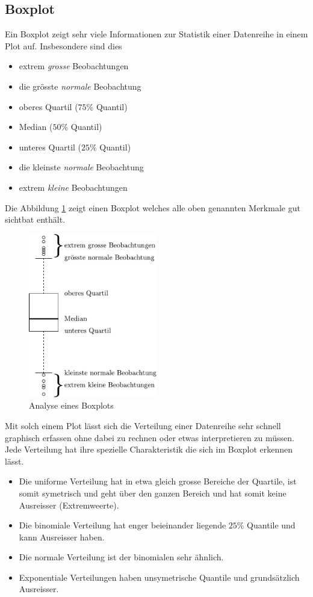 \clearpage

\subsection{Boxplot}
Ein Boxplot zeigt sehr viele Informationen zur Statistik einer 
Datenreihe in einem Plot auf. Insbesondere sind dies
\begin{itemize}
	\item extrem \emph{grosse} Beobachtungen
	\item die grösste \emph{normale} Beobachtung
	\item oberes Quartil ($75$\% Quantil)
	\item Median ($50$\% Quantil)
	\item unteres Quartil ($25$\% Quantil)
	\item die kleinste \emph{normale} Beobachtung
	\item extrem \emph{kleine} Beobachtungen
\end{itemize}
Die Abbildung \ref{fig:boxplot} zeigt einen Boxplot welches alle
oben genannten Merkmale gut sichtbat enthält.

\begin{figure}[h!]
	\centering
	\includegraphics[width=0.5\textwidth]{boxplot.pdf}
	\caption{Analyse eines Boxplots}
	\label{fig:boxplot}
\end{figure}

\noindent
Mit solch einem Plot lässt sich die Verteilung einer Datenreihe sehr
schnell graphisch erfassen ohne dabei zu rechnen oder etwas 
interpretieren zu müssen. Jede Verteilung hat ihre spezielle 
Charakteristik die sich im Boxplot erkennen lässt.
\begin{itemize}
	\item Die uniforme Verteilung hat in etwa gleich grosse Bereiche
		der Quartile, ist somit symetrisch und geht über den 
		ganzen Bereich und hat somit keine Ausreisser 
		(Extremweerte).
	\item Die binomiale Verteilung hat enger beieinander liegende
		$25$\% Quantile und kann Ausreisser haben.
	\item Die normale Verteilung ist der binomialen sehr ähnlich.
	\item Exponentiale Verteilungen haben unsymetrische Quantile
		und grundsätzlich Ausreisser.
\end{itemize}





